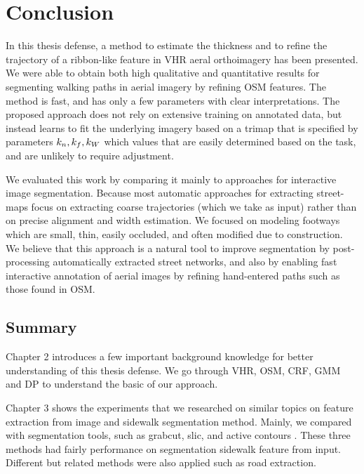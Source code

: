 \chapter{Conclusion}
In this thesis defense, a method to estimate the thickness and to refine the trajectory of a ribbon-like feature in \ac{VHR} aeral orthoimagery has been presented. 
We were able to obtain both high qualitative and quantitative results for segmenting walking paths in aerial imagery by refining \ac{OSM} features. The method is fast, and has only a few parameters with clear interpretations.
The proposed approach does not rely on extensive training on annotated data, but instead learns to fit the underlying imagery based on a trimap that is specified by parameters $k_n{}, k_f{}, k_W{}$ which values that are easily determined based on the task, and are unlikely to require adjustment. 

We evaluated this work by comparing it mainly to approaches for interactive image segmentation. 
Because most automatic approaches for extracting street-maps focus on extracting coarse trajectories (which we take as input) rather than on precise alignment and width estimation. 
We focused on modeling footways which are small, thin, easily occluded, and often modified due to construction.
We believe that this approach is a natural tool to improve segmentation by post-processing automatically extracted street networks, and also by enabling fast interactive annotation of aerial images by refining hand-entered paths such as those found in \ac{OSM}.

\section{Summary}
Chapter 2 introduces a few important background knowledge for better understanding of this thesis defense. We go through \ac{VHR}, \ac{OSM}\cite{OpenStreetMap}, \ac{CRF}\cite{MAL-013}, \ac{GMM}\cite{sridharan2014gaussian} and \ac{DP}\cite{bellman2013dynamic} to understand the basic of our approach.   

Chapter 3 shows the experiments that we researched on similar topics on feature extraction from image and sidewalk segmentation method. Mainly, we compared with segmentation tools, such as grabcut\cite{Rother2004-ou}, slic\cite{Achanta:149300}, and active contours \cite{Kass88snakes:active}. These three methods had fairly performance on segmentation sidewalk feature from input. Different but related methods were also applied such as road extraction\cite{road_detect}.

